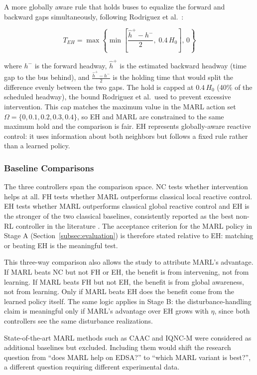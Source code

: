 A more globally aware rule that holds buses to equalize the forward and backward gaps simultaneously, following Rodriguez et al.~\cite{Rodriguez2023Cooperative}:

\begin{equation}
T_{EH} = \max\!\left\{\min\!\left[\frac{\hat{h}^+ - h^-}{2},\; 0.4\,H_0\right],\, 0\right\}
\label{eq:eh}
\end{equation}

where $h^-$ is the forward headway, $\hat{h}^+$ is the estimated backward headway (time gap to the bus behind), and $\frac{\hat{h}^+ - h^-}{2}$ is the holding time that would split the difference evenly between the two gaps. The hold is capped at $0.4\,H_0$ (40\% of the scheduled headway), the bound Rodriguez et al.\ used to prevent excessive intervention. This cap matches the maximum value in the MARL action set $\Omega = \{0, 0.1, 0.2, 0.3, 0.4\}$, so EH and MARL are constrained to the same maximum hold and the comparison is fair. EH represents globally-aware reactive control: it uses information about both neighbors but follows a fixed rule rather than a learned policy.

\subsubsection{Baseline Comparisons}

The three controllers span the comparison space. NC tests whether intervention helps at all. FH tests whether MARL outperforms classical local reactive control. EH tests whether MARL outperforms classical global reactive control and EH is the stronger of the two classical baselines, consistently reported as the best non-RL controller in the literature \cite{Wangsun,Rodriguez2023Cooperative}. The acceptance criterion for the MARL policy in Stage A (Section~\ref{subsec:evaluation}) is therefore stated relative to EH: matching or beating EH is the meaningful test.

This three-way comparison also allows the study to attribute MARL's advantage. If MARL beats NC but not FH or EH, the benefit is from intervening, not from learning. If MARL beats FH but not EH, the benefit is from global awareness, not from learning. Only if MARL beats EH does the benefit come from the learned policy itself. The same logic applies in Stage B: the disturbance-handling claim is meaningful only if MARL's advantage over EH grows with $\eta$, since both controllers see the same disturbance realizations.

State-of-the-art MARL methods such as CAAC and IQNC-M \cite{Wangsun} were considered as additional baselines but excluded. Including them would shift the research question from ``does MARL help on EDSA?'' to ``which MARL variant is best?'', a different question requiring different experimental data. 

